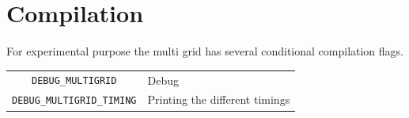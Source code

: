 \documentclass[11pt]{article}
\begin{document}
\section{Compilation}

For experimental purpose the multi grid has several conditional compilation
flags.\\
\begin{tabular}{cp{7cm}}
\texttt{\small DEBUG\_MULTIGRID}         & Debug\\
\texttt{\small DEBUG\_MULTIGRID\_TIMING} & Printing the different timings\\
\end{tabular}

\end{document}
